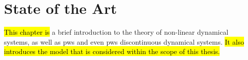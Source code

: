 \chapter{State of the Art}
\label{chap:state}

\hl{This chapter is} a brief introduction to the theory of non-linear dynamical systems, as well as \gls{pws} and even \gls{pws} discontinuous dynamical systems.
\hl{
	It also introduces the model that is considered within the scope of this thesis.
}








